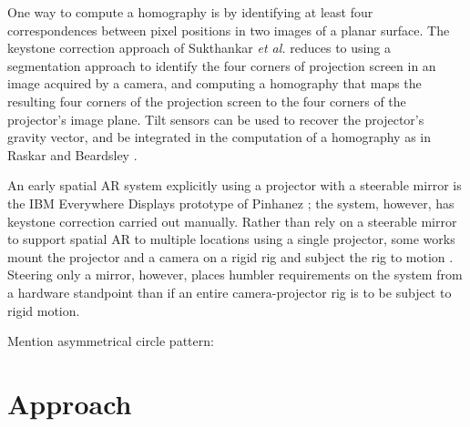 \documentclass[review]{elsarticle}
\begin{document}
One way to compute a homography is by identifying at least four correspondences between pixel positions in two images of a planar surface. The keystone correction approach of Sukthankar \textit{et al.} \cite{sukthankar2001smarter} reduces to using a segmentation approach to identify the four corners of projection screen in an image acquired by a camera, and computing a homography that maps the resulting four corners of the projection screen to the four corners of the projector's image plane. Tilt sensors can be used to recover the projector's gravity vector, and be integrated in the computation of a homography as in Raskar and Beardsley \cite{raskar2001self}.

An early spatial AR system explicitly using a projector with a steerable mirror is the IBM Everywhere Displays prototype of Pinhanez \cite{pinhanez2001everywhere}; the system, however, has keystone correction carried out manually. Rather than rely on a steerable mirror to support spatial AR to multiple locations using a single projector, some works mount the projector and a camera on a rigid rig and subject the rig to motion \cite{ehnes2004projected,borkowski2004spatial,butz2006applying}. Steering only a mirror, however, places humbler requirements on the system from a hardware standpoint than if an entire camera-projector rig is to be subject to rigid motion.

Mention asymmetrical circle pattern: \cite{chiu2011novel}



\section{Approach}
\end{document}
